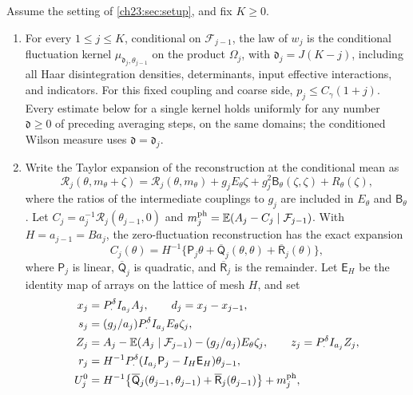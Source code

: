 \begin{lemma}\label{ch23:lem:four-piece-increment}
Assume the setting of \cref{ch23:sec:setup}, and fix $K\ge0$.
\begin{enumerate}
\item For every $1\le j\le K$, conditional on $\mathcal F_{j-1}$, the law of $w_j$ is the conditional fluctuation kernel $\mu_{\mathfrak d_j,\theta_{j-1}}$ on the product $\Omega_j$, with $\mathfrak d_j=J(K-j)$, including all Haar disintegration densities, determinants, input effective interactions, and indicators. For this fixed coupling and coarse side, $p_j\le C_\gamma(1+j)$. Every estimate below for a single kernel holds uniformly for any number $\mathfrak d\ge0$ of preceding averaging steps, on the same domains; the conditioned Wilson measure uses $\mathfrak d=\mathfrak d_j$.
\item Write the Taylor expansion of the reconstruction at the conditional mean as
\begin{equation}\label{ch23:eq:taylor-at-mean}
 \mathscr R_j(\theta,m_\theta+\zeta)
 =\mathscr R_j(\theta,m_\theta)+g_jE_\theta\zeta+g_j^2\mathsf B_\theta(\zeta,\zeta)+R_\theta(\zeta),
\end{equation}
where the ratios of the intermediate couplings to $g_j$ are included in $E_\theta$ and $\mathsf B_\theta$. Let $C_j=a_j^{-1}\mathscr R_j(\theta_{j-1},0)$ and $m_j^{\mathrm{ph}}=\mathbb E(A_j-C_j\mid\mathcal F_{j-1})$. With $H=a_{j-1}=Ba_j$, the zero-fluctuation reconstruction has the exact expansion
\begin{equation}\label{ch23:eq:center-expansion}
 C_j(\theta)=H^{-1}\bigl\{\mathsf P_j\theta+\overline{\mathsf Q}_j(\theta,\theta)+\overline{\mathsf R}_j(\theta)\bigr\},
\end{equation}
where $\mathsf P_j$ is linear, $\overline{\mathsf Q}_j$ is quadratic, and $\overline{\mathsf R}_j$ is the remainder. Let $\mathsf E_H$ be the identity map of arrays on the lattice of mesh $H$, and set
\begin{equation}\label{ch23:eq:four-terms}
 \begin{split}
 x_j&=P_\cdot^\delta I_{a_j}A_j,\qquad d_j=x_j-x_{j-1},\\
 s_j&=(g_j/a_j)P_\cdot^\delta I_{a_j}E_\theta\zeta_j,\\
 Z_j&=A_j-\E(A_j\mid\mathcal F_{j-1})-(g_j/a_j)E_\theta\zeta_j,\qquad
 z_j=P_\cdot^\delta I_{a_j}Z_j,\\
 r_j&=H^{-1}P_\cdot^\delta(I_{a_j}\mathsf P_j-I_H\mathsf E_H)\theta_{j-1},\\
 U_j^0&=H^{-1}\bigl\{\overline{\mathsf Q}_j(\theta_{j-1},\theta_{j-1})+\overline{\mathsf R}_j(\theta_{j-1})\bigr\}+m_j^{\mathrm{ph}},\qquad

\end{split}
\end{equation}
\end{enumerate}
\end{lemma}
